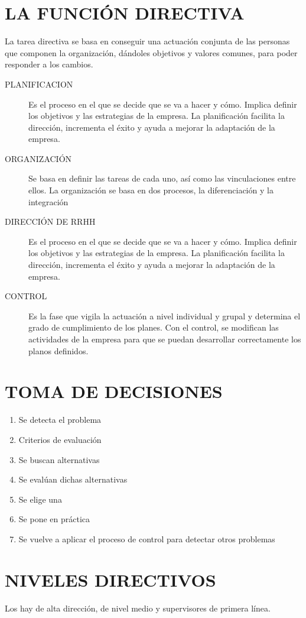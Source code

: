 \documentclass[12pt, twoside, openright]{report} %
\begin{document}
\section{LA FUNCIÓN DIRECTIVA}
La tarea directiva se basa en conseguir una actuación conjunta de las personas que componen la
organización, dándoles objetivos y valores comunes, para poder responder a los cambios.
\begin{description}
	\item[PLANIFICACION] Es el proceso en el que se decide que se va a hacer y cómo. Implica definir los
	      objetivos y las estrategias de la empresa. La planificación facilita la dirección, incrementa el
	      éxito y ayuda a mejorar la adaptación de la empresa.
	\item[ORGANIZACIÓN] Se basa en definir las tareas de cada uno, así como las vinculaciones entre
	      ellos. La organización se basa en dos procesos, la diferenciación y la integración
	\item[DIRECCIÓN DE RRHH] Es el proceso en el que se decide que se va a hacer y cómo. Implica definir los
	      objetivos y las estrategias de la empresa. La planificación facilita la dirección, incrementa el
	      éxito y ayuda a mejorar la adaptación de la empresa.
	\item[CONTROL] Es la fase que vigila la actuación a nivel individual y grupal y determina el grado de
	      cumplimiento de los planes. Con el control, se modifican las actividades de la empresa para
	      que se puedan desarrollar correctamente los planos definidos.
\end{description}

\section{TOMA DE DECISIONES}
\begin{enumerate}
	\item Se detecta el problema
	\item Criterios de evaluación
	\item Se buscan alternativas
	\item Se evalúan dichas alternativas
	\item Se elige una
	\item Se pone en práctica
	\item Se vuelve a aplicar el proceso de control para detectar otros problemas
\end{enumerate}

\section{NIVELES DIRECTIVOS}
Los hay de alta dirección, de nivel medio y supervisores de primera línea.
\end{document}
